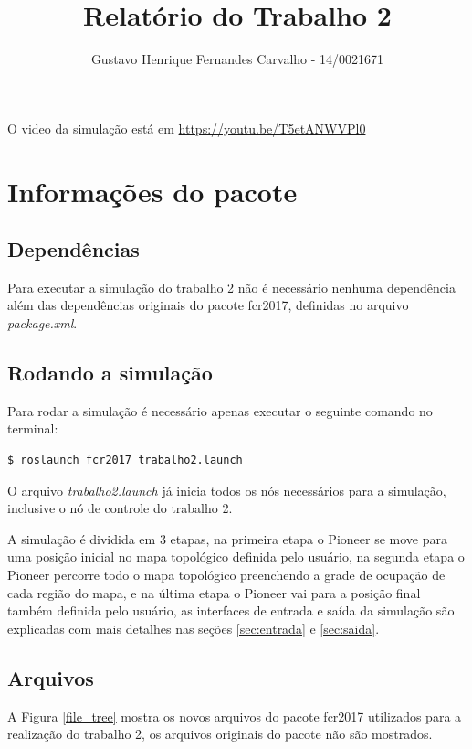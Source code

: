 \documentclass{llncs}
\begin{document}
\title{Relatório do Trabalho 2}
\author{Gustavo Henrique Fernandes Carvalho - 14/0021671}
\maketitle


O video da simulação está em \url{https://youtu.be/T5etANWVPl0}


\section{Informações do pacote}
\subsection{Dependências}
Para executar a simulação do trabalho 2 não é necessário nenhuma dependência além das dependências originais do pacote fcr2017, definidas no arquivo \textit{package.xml}.


\subsection{Rodando a simulação}
Para rodar a simulação é necessário apenas executar o seguinte comando no terminal:
\begin{lstlisting}[language=bash]
	$ roslaunch fcr2017 trabalho2.launch
\end{lstlisting}
O arquivo \textit{trabalho2.launch} já inicia todos os nós necessários para a simulação, inclusive o nó de controle do trabalho 2.

A simulação é dividida em 3 etapas, na primeira etapa o Pioneer se move para uma posição inicial no mapa topológico definida pelo usuário, na segunda etapa o Pioneer percorre todo o mapa topológico preenchendo a grade de ocupação de cada região do mapa, e na última etapa o Pioneer vai para a posição final também  definida pelo usuário, as interfaces de entrada e saída da simulação são explicadas com mais detalhes nas seções \ref{sec:entrada} e \ref{sec:saida}.


\subsection{Arquivos}
A Figura \ref{file_tree} mostra os novos arquivos do pacote fcr2017 utilizados para a realização do trabalho 2, os arquivos originais do pacote não são mostrados.
\end{document}
